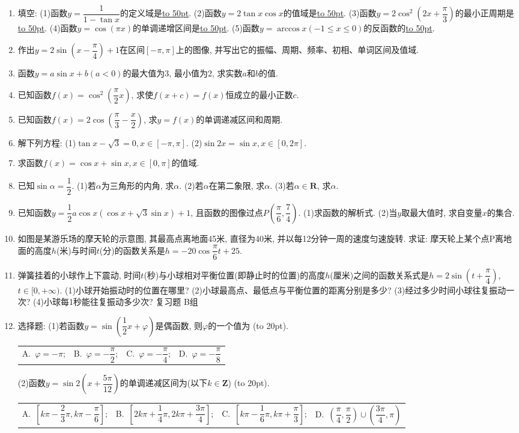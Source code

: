 \documentclass[10pt,a4paper]{article}
\newcommand{\blank}[1]{\underline{\hbox to #1pt{}}}
\newcommand{\bracket}[1]{(\hbox to #1pt{})}
\newcommand{\fourch}[4]{\par\begin{tabular}{p{.23\textwidth}p{.23\textwidth}p{.23\textwidth}p{.23\textwidth}}
A.~#1 &B.~#2& C.~#3& D.~#4
\end{tabular}}
\begin{document}
\begin{enumerate}[1.]
\fourch{\textcircled{1} 、\textcircled{2} ;}{\textcircled{1} 、\textcircled{3} ;}{\textcircled{2} 、\textcircled{4} ;}{\textcircled{3} 、\textcircled{4} }
\item 填空:
(1)函数$y=\dfrac 1{1-\tan x}$的定义域是\blank{50}.
(2)函数$y=2\tan x\cos x$的值域是\blank{50}.
(3)函数$y=2\cos ^2(2x+\dfrac{\pi }3)$的最小正周期是\blank{50}.
(4)函数$y=\cos (\pi x)$的单调递增区间是\blank{50}.
(5)函数$y=\arccos x(-1\le x\le 0)$的反函数的\blank{50}.
\item 作出$y=2\sin (x-\dfrac{\pi }4)+1$在区间$[-\pi ,\pi]$上的图像, 并写出它的振幅、周期、频率、初相、单词区间及值域.
\item 函数$y=a\sin x+b(a<0)$的最大值为3, 最小值为2, 求实数$a$和$b$的值.
\item 已知函数$f(x)=\cos ^2(\dfrac{\pi }2x)$, 求使$f(x+c)=f(x)$恒成立的最小正数$c$.
\item 已知函数$f(x)=2\cos (\dfrac{\pi }3-\dfrac x2)$, 求$y=f(x)$的单调递减区间和周期.
\item 解下列方程:
(1)$\tan x-\sqrt 3=0,x\in [-\pi ,\pi]$.
(2)$\sin 2x=\sin x,x\in [0,2\pi]$.
\item 求函数$f(x)=\cos x+\sin x,x\in [0,\pi]$的值域.
\item 已知$\sin \alpha =\dfrac 12$.
(1)若$\alpha$为三角形的内角, 求$\alpha$.
(2)若$\alpha$在第二象限, 求$\alpha$.
(3)若$\alpha \in \mathbf{R}$, 求$\alpha$.
\item 已知函数$y=\dfrac 12a\cos x(\cos x+\sqrt 3\sin x)+1$, 且函数的图像过点$P(\dfrac{\pi }6,\dfrac 74)$.
(1)求函数的解析式.
(2)当$y$取最大值时, 求自变量$x$的集合.
\item 如图是某游乐场的摩天轮的示意图, 其最高点离地面45米, 直径为40米, 并以每12分钟一周的速度匀速旋转. 求证: 摩天轮上某个点P离地面的高度$h$(米)与时间$t$(分)的函数关系是$h=-20\cos \dfrac{\pi }6t+25$.
\item 弹簧挂着的小球作上下震动, 时间$t$(秒)与小球相对平衡位置(即静止时的位置)的高度$h$(厘米)之间的函数关系式是$h=2\sin (t+\dfrac{\pi }4)$, $t\in [0,+\infty)$.
(1)小球开始振动时的位置在哪里?
(2)小球最高点、最低点与平衡位置的距离分别是多少?
(3)经过多少时间小球往复振动一次?
(4)小球每1秒能往复振动多少次?
复习题
B组
\item 选择题:
(1)若函数$y=\sin (\dfrac 12x+\varphi)$是偶函数, 则$\varphi$的一个值为				\bracket{20}.
\fourch{$\varphi =-\pi$;}{$\varphi =-\dfrac{\pi }2$;}{$\varphi =-\dfrac{\pi }4$;}{$\varphi =-\dfrac{\pi }8$}
(2)函数$y=\sin 2(x+\dfrac{5\pi }{12})$的单调递减区间为(以下$k\in \mathbf{Z}$)			\bracket{20}.
\fourch{$[k\pi -\dfrac 23\pi ,k\pi -\dfrac{\pi }6]$;}{$[2k\pi +\dfrac 14\pi ,2k\pi +\dfrac{3\pi }4]$;}{$[k\pi -\dfrac 16\pi ,k\pi +\dfrac{\pi }3]$;}{$(\dfrac{\pi }4,\dfrac{\pi }2)\cup (\dfrac{3\pi }4,\pi)$}

\end{enumerate}
\end{document}
